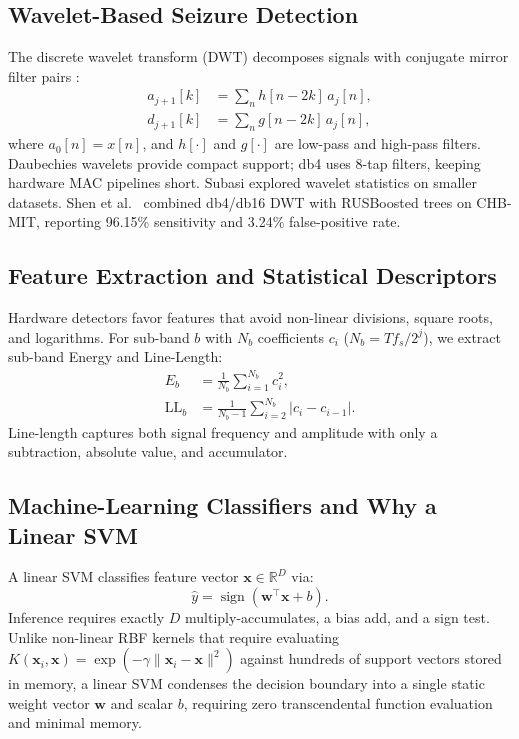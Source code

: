 \documentclass[10pt,twocolumn,letterpaper]{article}
\begin{document}
\subsection{Wavelet-Based Seizure Detection}

The discrete wavelet transform (DWT) decomposes signals with conjugate mirror filter pairs \cite{mallat1989theory}:
\begin{align}
a_{j+1}[k] &= \sum_n h[n-2k]\,a_j[n], \label{eq:dwt_lo}\\
d_{j+1}[k] &= \sum_n g[n-2k]\,a_j[n], \label{eq:dwt_hi}
\end{align}
where $a_0[n]=x[n]$, and $h[\cdot]$ and $g[\cdot]$ are low-pass and high-pass filters. Daubechies wavelets \cite{daubechies1988orthonormal} provide compact support; db4 uses 8-tap filters, keeping hardware MAC pipelines short. Subasi \cite{subasi2007eeg} explored wavelet statistics on smaller datasets. Shen et al.\ \cite{shen2022dwt} combined db4/db16 DWT with RUSBoosted trees on CHB-MIT, reporting 96.15\% sensitivity and 3.24\% false-positive rate.

\subsection{Feature Extraction and Statistical Descriptors}
\label{sec:features}

Hardware detectors favor features that avoid non-linear divisions, square roots, and logarithms. For sub-band $b$ with $N_b$ coefficients $c_i$ ($N_b = T f_s / 2^j$), we extract sub-band Energy and Line-Length:
\begin{align}
  E_b &= \frac{1}{N_b}\sum_{i=1}^{N_b} c_i^{2}, \label{eq:energy}\\
  \mathrm{LL}_b &= \frac{1}{N_b-1}\sum_{i=2}^{N_b} \left| c_i - c_{i-1} \right|. \label{eq:ll}
\end{align}
Line-length \cite{esteller2001} captures both signal frequency and amplitude with only a subtraction, absolute value, and accumulator.

\subsection{Machine-Learning Classifiers and Why a Linear SVM}

A linear SVM \cite{cortes1995support} classifies feature vector $\mathbf{x} \in \mathbb{R}^D$ via:
\begin{equation}
  \hat{y} = \operatorname{sign}\!\left(\mathbf{w}^{\top}\mathbf{x} + b\right).
\end{equation}
Inference requires exactly $D$ multiply-accumulates, a bias add, and a sign test. Unlike non-linear RBF kernels that require evaluating $K(\mathbf{x}_i, \mathbf{x}) = \exp(-\gamma \|\mathbf{x}_i - \mathbf{x}\|^2)$ against hundreds of support vectors stored in memory, a linear SVM condenses the decision boundary into a single static weight vector $\mathbf{w}$ and scalar $b$, requiring zero transcendental function evaluation and minimal memory.
\end{document}
